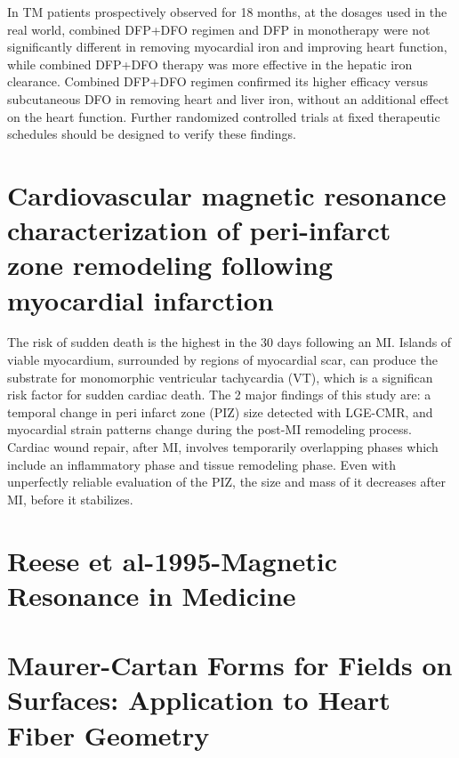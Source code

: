 In TM patients prospectively observed for 18 months, at the dosages used in the real world, combined DFP+DFO regimen and DFP in monotherapy were not significantly different in removing myocardial iron and improving heart function, while combined DFP+DFO therapy was more effective in the hepatic iron clearance. Combined DFP+DFO regimen confirmed its higher efficacy versus subcutaneous DFO in removing heart and liver iron, without an additional effect on the heart function. Further randomized controlled trials at fixed therapeutic schedules should be designed to verify these findings.

\section{Cardiovascular magnetic resonance characterization of peri-infarct zone remodeling following myocardial infarction}

The risk of sudden death is the highest in the 30 days following an MI. Islands of viable myocardium, surrounded by regions of myocardial scar, can produce the substrate for monomorphic ventricular tachycardia (VT), which is a significan risk factor for sudden cardiac death.
The 2 major findings of this study are: a temporal change in peri infarct zone (PIZ) size detected with LGE-CMR, and myocardial strain patterns change during the post-MI remodeling process.
Cardiac wound repair, after MI, involves temporarily overlapping phases which include an inflammatory phase and tissue remodeling phase.
Even with unperfectly reliable evaluation of the PIZ, the size and mass of it decreases after MI, before it stabilizes.

\section{Reese et al-1995-Magnetic Resonance in Medicine}

\section{Maurer-Cartan Forms for Fields on Surfaces: Application to Heart Fiber Geometry}

